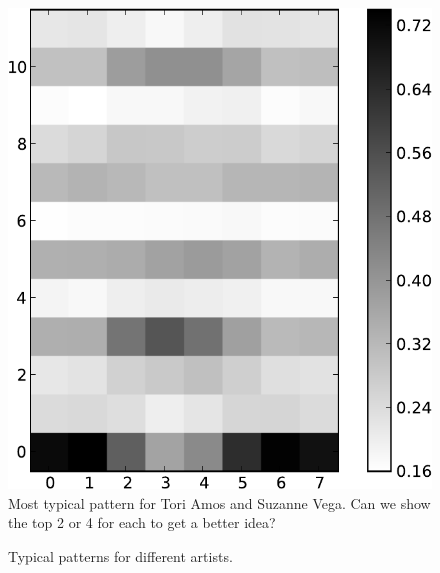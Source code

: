\documentclass{article}
\begin{document}
\begin{figure}[htb]
\begin{center}
\includegraphics[width=.4\columnwidth]{toriamos_suzannevega_pattern}
\end{center}
\caption{\small{Most typical pattern for Tori Amos and Suzanne Vega.
    Can we show the top 2 or 4 for each to get a better idea?}}
\label{fig:amosvega}
\end{figure}
\fi


\begin{figure}[h]
  \centering
  \hspace{5mm}                
  \vspace{2mm}
  \caption{\small{Typical patterns for different artists.}}
  \label{fig:typicalpat}
\end{figure}
\end{document}
